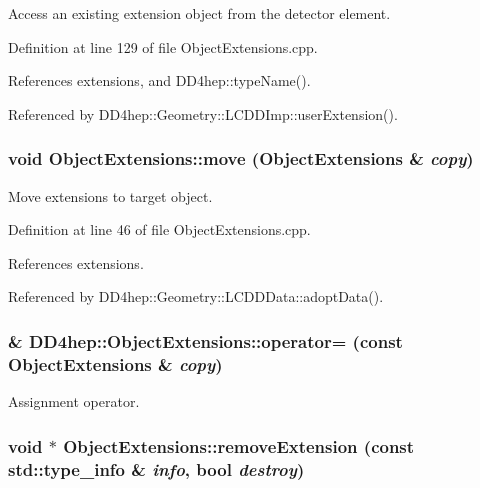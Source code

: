 Access an existing extension object from the detector element. 

Definition at line 129 of file ObjectExtensions.cpp.

References extensions, and DD4hep::typeName().

Referenced by DD4hep::Geometry::LCDDImp::userExtension().\hypertarget{class_d_d4hep_1_1_object_extensions_ab7062b99ac80518aa1b70da47a5d001a}{
\subsubsection[{move}]{\setlength{\rightskip}{0pt plus 5cm}void ObjectExtensions::move ({\bf ObjectExtensions} \& {\em copy})}}
\label{class_d_d4hep_1_1_object_extensions_ab7062b99ac80518aa1b70da47a5d001a}


Move extensions to target object. 

Definition at line 46 of file ObjectExtensions.cpp.

References extensions.

Referenced by DD4hep::Geometry::LCDDData::adoptData().\hypertarget{class_d_d4hep_1_1_object_extensions_a14ffdd10b622fdfebd42a45ca2fd42c0}{
\subsubsection[{operator=}]{\& DD4hep::ObjectExtensions::operator= (const {\bf ObjectExtensions} \& {\em copy})}}
\label{class_d_d4hep_1_1_object_extensions_a14ffdd10b622fdfebd42a45ca2fd42c0}


Assignment operator. \hypertarget{class_d_d4hep_1_1_object_extensions_a4ee557d0bcce3b57dd6f462a6967dd6b}{
\subsubsection[{removeExtension}]{\setlength{\rightskip}{0pt plus 5cm}void $\ast$ ObjectExtensions::removeExtension (const std::type\_\-info \& {\em info}, \/  bool {\em destroy})}}
\label{class_d_d4hep_1_1_object_extensions_a4ee557d0bcce3b57dd6f462a6967dd6b}



